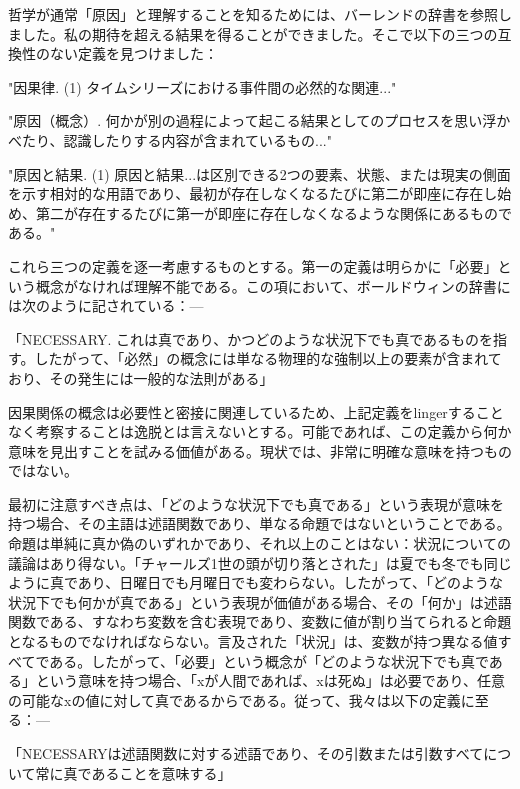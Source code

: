 \documentclass[a4paper,11pt,openany]{ltjsbook}
\begin{document}
哲学が通常「原因」と理解することを知るためには、バーレンドの辞書を参照しました。私の期待を超える結果を得ることができました。そこで以下の三つの互換性のない定義を見つけました：

  "因果律. (1) タイムシリーズにおける事件間の必然的な関連..."

  "原因（概念）. 何かが別の過程によって起こる結果としてのプロセスを思い浮かべたり、認識したりする内容が含まれているもの..."

  "原因と結果. (1) 原因と結果...は区別できる2つの要素、状態、または現実の側面を示す相対的な用語であり、最初が存在しなくなるたびに第二が即座に存在し始め、第二が存在するたびに第一が即座に存在しなくなるような関係にあるものである。"

これら三つの定義を逐一考慮するものとする。第一の定義は明らかに「必要」という概念がなければ理解不能である。この項において、ボールドウィンの辞書には次のように記されている：—

「NECESSARY. これは真であり、かつどのような状況下でも真であるものを指す。したがって、「必然」の概念には単なる物理的な強制以上の要素が含まれており、その発生には一般的な法則がある」

因果関係の概念は必要性と密接に関連しているため、上記定義をlingerすることなく考察することは逸脱とは言えないとする。可能であれば、この定義から何か意味を見出すことを試みる価値がある。現状では、非常に明確な意味を持つものではない。

最初に注意すべき点は、「どのような状況下でも真である」という表現が意味を持つ場合、その主語は述語関数であり、単なる命題ではないということである。 命題は単純に真か偽のいずれかであり、それ以上のことはない：状況についての議論はあり得ない。「チャールズ1世の頭が切り落とされた」は夏でも冬でも同じように真であり、日曜日でも月曜日でも変わらない。したがって、「どのような状況下でも何かが真である」という表現が価値がある場合、その「何か」は述語関数である、すなわち変数を含む表現であり、変数に値が割り当てられると命題となるものでなければならない。言及された「状況」は、変数が持つ異なる値すべてである。したがって、「必要」という概念が「どのような状況下でも真である」という意味を持つ場合、「xが人間であれば、xは死ぬ」は必要であり、任意の可能なxの値に対して真であるからである。従って、我々は以下の定義に至る：—

「NECESSARYは述語関数に対する述語であり、その引数または引数すべてについて常に真であることを意味する」
\end{document}
